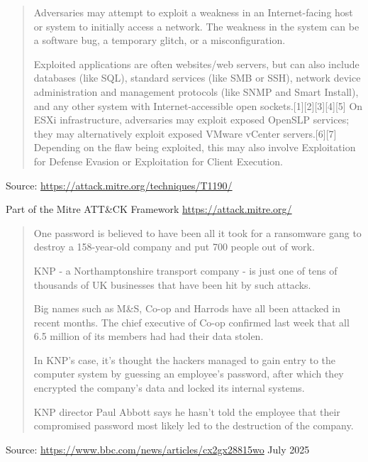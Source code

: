 \documentclass[Screen16to9,17pt]{foils}
\begin{document}

\begin{quote}
Adversaries may attempt to exploit a weakness in an Internet-facing host or system to initially access a network. The weakness in the system can be a software bug, a temporary glitch, or a misconfiguration.

Exploited applications are often websites/web servers, but can also include databases (like SQL), standard services (like SMB or SSH), network device administration and management protocols (like SNMP and Smart Install), and any other system with Internet-accessible open sockets.[1][2][3][4][5] On ESXi infrastructure, adversaries may exploit exposed OpenSLP services; they may alternatively exploit exposed VMware vCenter servers.[6][7] Depending on the flaw being exploited, this may also involve Exploitation for Defense Evasion or Exploitation for Client Execution.
\end{quote}
Source: \url{https://attack.mitre.org/techniques/T1190/}


\begin{list2}
    \item Part of the Mitre ATT\&CK Framework \url{https://attack.mitre.org/}
\end{list2}




\begin{quote}
One password is believed to have been all it took for a ransomware gang to destroy a 158-year-old company and put 700 people out of work.

KNP - a Northamptonshire transport company - is just one of tens of thousands of UK businesses that have been hit by such attacks.

Big names such as M\&S, Co-op and Harrods have all been attacked in recent months. The chief executive of Co-op confirmed last week that all 6.5 million of its members had had their data stolen.

In KNP's case, it's thought the hackers managed to gain entry to the computer system by guessing an employee's password, after which they encrypted the company's data and locked its internal systems.

KNP director Paul Abbott says he hasn't told the employee that their compromised password most likely led to the destruction of the company.
\end{quote}
Source: \url{https://www.bbc.com/news/articles/cx2gx28815wo} July 2025
\end{document}
